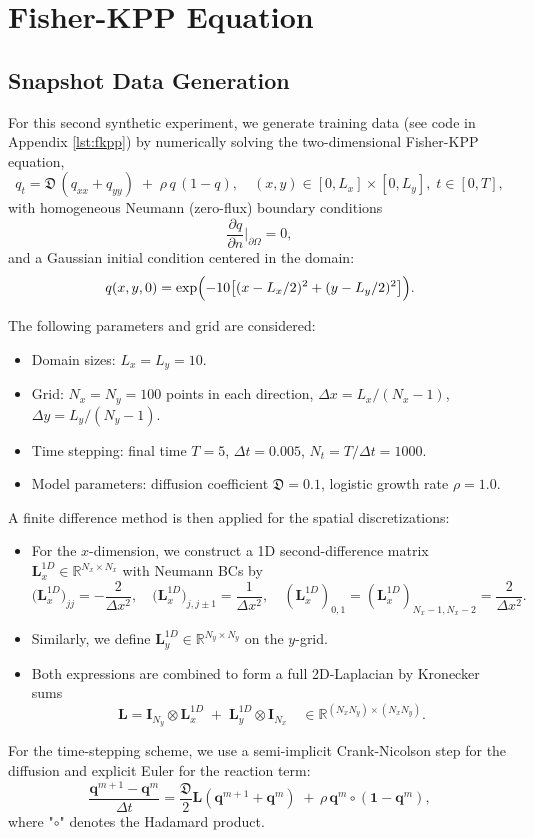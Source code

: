 \section{Fisher-KPP Equation}
\label{sec:fkpp_eq}

\subsection*{Snapshot Data Generation}

For this second synthetic experiment, we generate training data (see code in Appendix \ref{lst:fkpp}) by numerically solving the two-dimensional Fisher-KPP equation,\\
$$q_t = \mathfrak{D}\,(q_{xx} + q_{yy}) \;+\; \rho\,q\,(1 - q), \quad (x,y)\in[0,L_x]\times[0,L_y],\;t\in[0,T],$$
with homogeneous Neumann (zero-flux) boundary conditions\\
$$\frac{\partial q}{\partial n}\Big|_{\partial\Omega} = 0,$$
and a Gaussian initial condition centered in the domain:\\
$$q(x,y,0)= \exp\Bigl(-10\bigl[(x - L_x/2)^2 + (y - L_y/2)^2\bigr]\Bigr).$$

The following parameters and grid are considered:
\begin{itemize}
  \item Domain sizes: $L_x = L_y = 10$.
  \item Grid: $N_x = N_y = 100$ points in each direction, $\Delta x = L_x/(N_x-1)$, $\Delta y = L_y/(N_y-1)$.
  \item Time stepping: final time $T=5$, $\Delta t=0.005$, $N_t = T/\Delta t = 1000$.
  \item Model parameters: diffusion coefficient $\mathfrak{D}=0.1$, logistic growth rate $\rho=1.0$.
\end{itemize}
A finite difference method is then applied for the spatial discretizations:
\begin{itemize}
  \item For the $x$-dimension, we construct a 1D second-difference matrix $\mathbf{L}_x^{1D}\in\mathbb R^{N_x\times N_x}$ with Neumann BCs by\\
$$\bigl(\mathbf{L}_x^{1D}\bigr)_{jj}= -\frac{2}{\Delta x^2}, \quad \bigl(\mathbf{L}_x^{1D}\bigr)_{j,j\pm1}= \frac{1}{\Delta x^2},
      \quad (\mathbf{L}_x^{1D})_{0,1} = (\mathbf{L}_x^{1D})_{N_x-1,N_x-2} = \frac{2}{\Delta x^2}.$$
  \item Similarly, we define \(\mathbf{L}_y^{1D}\in\mathbb R^{N_y\times N_y}\) on the \(y\)-grid.
  \item Both expressions are combined to form a full 2D-Laplacian by Kronecker sums\\
    $$\mathbf{L} = \mathbf{I}_{N_y}\otimes \mathbf{L}_x^{1D} \;+\; \mathbf{L}_y^{1D}\otimes \mathbf{I}_{N_x}\quad\in\mathbb R^{(N_xN_y)\times(N_xN_y)}.$$
\end{itemize}
For the time-stepping scheme, we use a semi-implicit Crank-Nicolson step for the diffusion and explicit Euler for the reaction term:\\
$$\dfrac{\mathbf{q}^{m+1} - \mathbf{q}^{m}}{\Delta t} = \dfrac{\mathfrak{D}}{2}\mathbf{L}(\mathbf{q}^{m+1}+\mathbf{q}^m)\;+\,\rho\,\mathbf{q}^m\circ(\mathbf{1} - \mathbf{q}^m),$$ 
where "$\circ$" denotes the Hadamard product.


